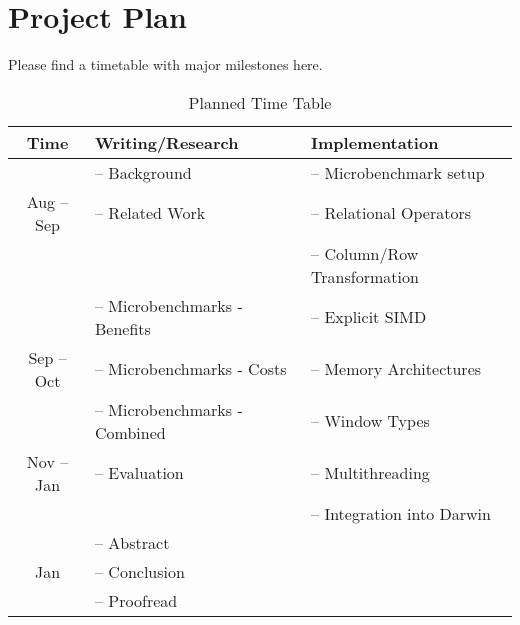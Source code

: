 \section{Project Plan}
\label{sec:plan}

Please find a timetable with major milestones here.

\begin{table}[h!]
    \centering
    \begin{tabular}{ | c | m{} | m{} | }
        \hline
        \textbf{Time}   & \textbf{Writing/Research}   & \textbf{Implementation} \\
        \hline
                        & -- Background                 & -- Microbenchmark setup\\
        Aug -- Sep      & -- Related Work               & -- Relational Operators\\
                        &                               & -- Column/Row Transformation\\
        \hline
                        & -- Microbenchmarks - Benefits & -- Explicit SIMD\\
        Sep -- Oct      & -- Microbenchmarks - Costs    & -- Memory Architectures\\
                        & -- Microbenchmarks - Combined & -- Window Types\\
        \hline        
        Nov -- Jan      & -- Evaluation                 & -- Multithreading\\
                        &                               & -- Integration into Darwin\\
        \hline
                        & -- Abstract                   &\\
        Jan             & -- Conclusion                 &\\
                        & -- Proofread                  &\\
        \hline
    \end{tabular}
    \caption{Planned Time Table}
    \label{tab:time-table}
\end{table}
